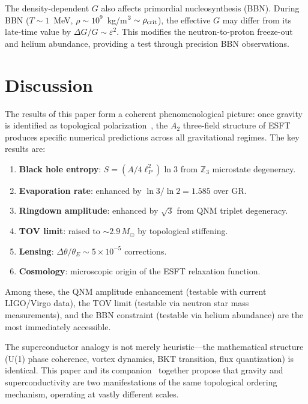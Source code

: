 ﻿\documentclass[twocolumn,preprintnumbers,amsmath,amssymb,prd]{revtex4-2}
\begin{document}
The density-dependent $G$ also affects primordial nucleosynthesis (BBN). During BBN ($T \sim 1$~MeV, $\rho \sim 10^9$~kg/m$^3 \sim \rho_{\rm crit}$), the effective $G$ may differ from its late-time value by $\Delta G/G \sim \varepsilon^2$. This modifies the neutron-to-proton freeze-out and helium abundance, providing a test through precision BBN observations.

\section{Discussion}
\label{sec:discussion}

The results of this paper form a coherent phenomenological picture: once gravity is identified as topological polarization~\cite{Paper6}, the $A_2$ three-field structure of ESFT produces specific numerical predictions across all gravitational regimes. The key results are:

\begin{enumerate}
\item \textbf{Black hole entropy}: $S = (A/4\ell_P^2)\ln 3$ from $\mathbb{Z}_3$ microstate degeneracy.
\item \textbf{Evaporation rate}: enhanced by $\ln 3/\ln 2 = 1.585$ over GR.
\item \textbf{Ringdown amplitude}: enhanced by $\sqrt{3}$ from QNM triplet degeneracy.
\item \textbf{TOV limit}: raised to $\sim 2.9\,M_\odot$ by topological stiffening.
\item \textbf{Lensing}: $\Delta\theta/\theta_E \sim 5 \times 10^{-5}$ corrections.
\item \textbf{Cosmology}: microscopic origin of the ESFT relaxation function.
\end{enumerate}

Among these, the QNM amplitude enhancement (testable with current LIGO/Virgo data), the TOV limit (testable via neutron star mass measurements), and the BBN constraint (testable via helium abundance) are the most immediately accessible.

The superconductor analogy is not merely heuristic---the mathematical structure (U(1) phase coherence, vortex dynamics, BKT transition, flux quantization) is identical. This paper and its companion~\cite{Paper6} together propose that gravity and superconductivity are two manifestations of the same topological ordering mechanism, operating at vastly different scales.
\end{document}
